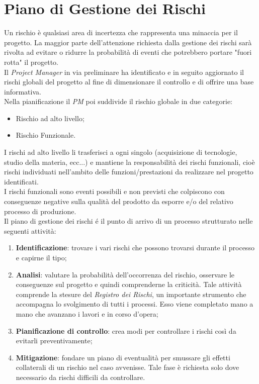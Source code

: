\documentclass[12pt,a4paper,titlepage]{article}
\begin{document}
	\section{Piano di Gestione dei Rischi}
	Un rischio è qualsiasi area di incertezza che rappresenta una minaccia per il progetto. La maggior parte dell'attenzione richiesta dalla gestione dei rischi sarà rivolta ad evitare o ridurre la probabilità di eventi che potrebbero portare "fuori rotta" il progetto.\\
	Il \textit{Project Manager} in via preliminare ha identificato e in seguito aggiornato il rischi globali del progetto al fine di dimensionare il controllo e di offrire una base informativa.\\
	Nella pianificazione il \textit{PM} poi suddivide il rischio globale in due categorie:
	\begin{itemize}
		\item Rischio ad alto livello;
		\item Rischio Funzionale.
	\end{itemize}
	I rischi ad alto livello li trasferisci a ogni singolo (acquisizione di tecnologie, studio della materia, ecc...) e mantiene la responsabilità dei rischi funzionali, cioè rischi individuati nell'ambito delle funzioni/prestazioni da realizzare nel progetto identificati.\\
	I rischi funzionali sono eventi possibili e non previsti che colpiscono con conseguenze negative sulla qualità del prodotto da esporre e/o del relativo processo di produzione.\\
	Il piano di gestione dei rischi é il punto di arrivo di un processo strutturato nelle seguenti attività:
	\begin{enumerate}
		\item \textbf{Identificazione}: trovare i vari rischi che possono trovarsi durante il processo e capirne il tipo;
		\item \textbf{Analisi}: valutare la probabilità dell'occorrenza del rischio, osservare le conseguenze sul progetto e quindi comprenderne la criticità. Tale attività comprende la stesure del \textit{Registro dei Rischi}, un importante strumento che accompagna lo svolgimento di tutti i processi. Esso viene completato mano a mano che avanzano i lavori e in corso d'opera;
		\item \textbf{Pianificazione di controllo}: crea modi per controllare i rischi così da evitarli preventivamente;
		\item \textbf{Mitigazione}: fondare un piano di eventualità per smussare gli effetti collaterali di un rischio nel caso avvenisse. Tale fase è richiesta solo dove necessario da rischi difficili da controllare.
	\end{enumerate}
\end{document}
